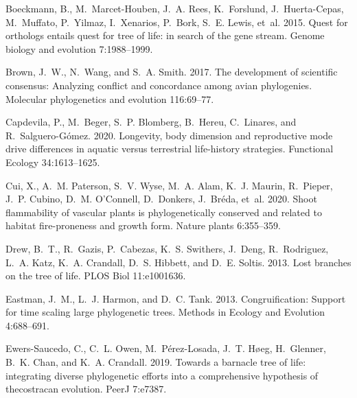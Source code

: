 \documentclass[oupdraft]{sysbio_sse}
\begin{document}
\begin{thebibliography}{49}
Boeckmann, B., M.~Marcet-Houben, J.~A. Rees, K.~Forslund, J.~Huerta-Cepas,
  M.~Muffato, P.~Yilmaz, I.~Xenarios, P.~Bork, S.~E. Lewis, et~al. 2015. Quest
  for orthologs entails quest for tree of life: in search of the gene stream.
  Genome biology and evolution 7:1988--1999.

Brown, J.~W., N.~Wang, and S.~A. Smith. 2017. The development of scientific
  consensus: Analyzing conflict and concordance among avian phylogenies.
  Molecular phylogenetics and evolution 116:69--77.

Capdevila, P., M.~Beger, S.~P. Blomberg, B.~Hereu, C.~Linares, and
  R.~Salguero-G{\'o}mez. 2020. Longevity, body dimension and reproductive mode
  drive differences in aquatic versus terrestrial life-history strategies.
  Functional Ecology 34:1613--1625.

Cui, X., A.~M. Paterson, S.~V. Wyse, M.~A. Alam, K.~J. Maurin, R.~Pieper, J.~P.
  Cubino, D.~M. O’Connell, D.~Donkers, J.~Br{\'e}da, et~al. 2020. Shoot
  flammability of vascular plants is phylogenetically conserved and related to
  habitat fire-proneness and growth form. Nature plants 6:355--359.

Drew, B.~T., R.~Gazis, P.~Cabezas, K.~S. Swithers, J.~Deng, R.~Rodriguez, L.~A.
  Katz, K.~A. Crandall, D.~S. Hibbett, and D.~E. Soltis. 2013. Lost branches on
  the tree of life. PLOS Biol 11:e1001636.

Eastman, J.~M., L.~J. Harmon, and D.~C. Tank. 2013. {Congruification: Support
  for time scaling large phylogenetic trees}. Methods in Ecology and Evolution
  4:688--691.

Ewers-Saucedo, C., C.~L. Owen, M.~P{\'e}rez-Losada, J.~T. H{\o}eg, H.~Glenner,
  B.~K. Chan, and K.~A. Crandall. 2019. Towards a barnacle tree of life:
  integrating diverse phylogenetic efforts into a comprehensive hypothesis of
  thecostracan evolution. PeerJ 7:e7387.


\end{thebibliography}
\end{document}
